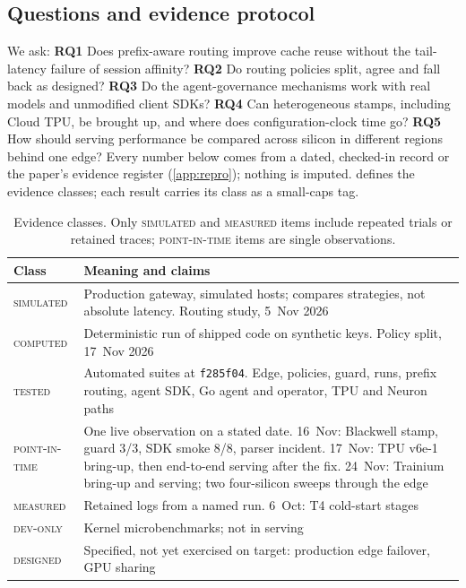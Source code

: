 \documentclass[conference,letterpaper]{IEEEtran}
\newcommand{\code}[1]{\texttt{\small #1}}
\newcommand{\ev}[1]{{\normalfont\textsc{#1}}}
\newcommand{\Measured}{\ev{measured}}
\newcommand{\PointInTime}{\ev{point-in-time}}
\newcommand{\Simulated}{\ev{simulated}}
\newcommand{\DevOnly}{\ev{dev-only}}
\newcommand{\Designed}{\ev{designed}}
\newcommand{\Tested}{\ev{tested}}
\newcommand{\Computed}{\ev{computed}}
\newcommand{\commit}{\code{f285f04}}
\begin{document}
\subsection{Questions and evidence protocol}
We ask: \textbf{RQ1} Does prefix-aware routing improve cache reuse without the tail-latency
failure of session affinity? \textbf{RQ2} Do routing policies split, agree and fall back as
designed? \textbf{RQ3} Do the agent-governance mechanisms work with real models and unmodified
client SDKs? \textbf{RQ4} Can heterogeneous stamps, including Cloud TPU, be brought up, and where
does configuration-clock time go? \textbf{RQ5} How should serving performance be compared across
silicon in different regions behind one edge? Every number below comes from a dated, checked-in record or
the paper's evidence register (\cref{app:repro}); nothing is imputed. 
defines the evidence classes; each result carries its class as a small-caps tag.

\begin{table}[t]
\centering
\caption{Evidence classes. Only \Simulated{} and \Measured{} items include repeated trials or
retained traces; \PointInTime{} items are single observations.}
\label{tab:evidence}
\footnotesize
\begin{tabularx}{\columnwidth}{@{}l X@{}}
\toprule
Class & Meaning and claims \\
\midrule
\Simulated{} & Production gateway, simulated hosts; compares strategies, not absolute latency. Routing study, 5~Nov 2026 \\
\Computed{} & Deterministic run of shipped code on synthetic keys. Policy split, 17~Nov 2026 \\
\Tested{} & Automated suites at \commit{}. Edge, policies, guard, runs, prefix routing, agent SDK, Go agent and operator, TPU and Neuron paths \\
\PointInTime{} & One live observation on a stated date. 16~Nov: Blackwell stamp, guard 3/3, SDK smoke 8/8, parser incident. 17~Nov: TPU v6e-1 bring-up, then end-to-end serving after the fix. 24~Nov: Trainium bring-up and serving; two four-silicon sweeps through the edge \\
\Measured{} & Retained logs from a named run. 6~Oct: T4 cold-start stages \\
\DevOnly{} & Kernel microbenchmarks; not in serving \\
\Designed{} & Specified, not yet exercised on target: production edge failover, GPU sharing \\
\bottomrule
\end{tabularx}
\end{table}
\end{document}
